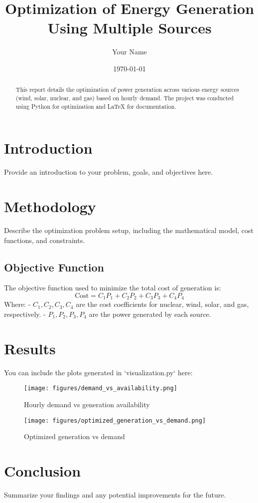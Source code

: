 \documentclass[a4paper,11pt]{article}
\title{Optimization of Energy Generation Using Multiple Sources}
\author{Your Name}
\date{\today}
\begin{document}
\maketitle

\begin{abstract}
This report details the optimization of power generation across various energy sources (wind, solar, nuclear, and gas) based on hourly demand. The project was conducted using Python for optimization and LaTeX for documentation.
\end{abstract}

\section{Introduction}
Provide an introduction to your problem, goals, and objectives here.

\section{Methodology}
Describe the optimization problem setup, including the mathematical model, cost functions, and constraints.

\subsection{Objective Function}
The objective function used to minimize the total cost of generation is:
\[
\text{Cost} = C_1 P_1 + C_2 P_2 + C_3 P_3 + C_4 P_4
\]
Where:
- \(C_1, C_2, C_3, C_4\) are the cost coefficients for nuclear, wind, solar, and gas, respectively.
- \(P_1, P_2, P_3, P_4\) are the power generated by each source.

\section{Results}
You can include the plots generated in `visualization.py` here:

\begin{figure}[h!]
    \centering
    \texttt{[image: figures/demand\_vs\_availability.png]}
    \caption{Hourly demand vs generation availability}
    \label{fig:demand_availability}
\end{figure}

\begin{figure}[h!]
    \centering
    \texttt{[image: figures/optimized\_generation\_vs\_demand.png]}
    \caption{Optimized generation vs demand}
    \label{fig:optimized_generation}
\end{figure}

\section{Conclusion}
Summarize your findings and any potential improvements for the future.



\end{document}
